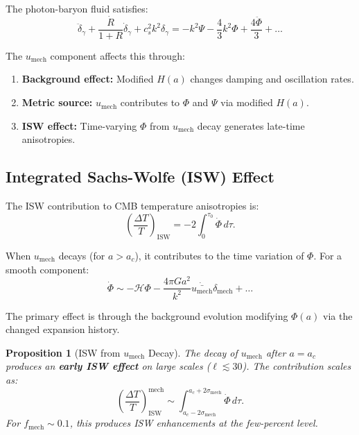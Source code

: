 \documentclass[11pt,a4paper]{article}
\newcommand{\umech}{\ensuremath{u_{\mathrm{mech}}}}
\newcommand{\fmech}{\ensuremath{f_{\mathrm{mech}}}}
\newcommand{\ac}{\ensuremath{a_c}}
\newcommand{\sigmamech}{\ensuremath{\sigma_{\mathrm{mech}}}}
\newtheorem{proposition}[theorem]{Proposition}
\theoremstyle{definition}
\theoremstyle{remark}
\begin{document}
The photon-baryon fluid satisfies:
\begin{equation}
\ddot{\delta}_\gamma + \frac{\dot{R}}{1+R}\dot{\delta}_\gamma + c_s^2 k^2 \delta_\gamma = -k^2\Psi - \frac{4}{3}k^2\Phi + \frac{4\ddot{\Phi}}{3} + \ldots
\end{equation}

The $\umech$ component affects this through:
\begin{enumerate}[leftmargin=*, itemsep=0.2em]
\item \textbf{Background effect:} Modified $H(a)$ changes damping and oscillation rates.
\item \textbf{Metric source:} $\umech$ contributes to $\Phi$ and $\Psi$ via modified $H(a)$.
\item \textbf{ISW effect:} Time-varying $\Phi$ from $\umech$ decay generates late-time anisotropies.
\end{enumerate}

\subsection{Integrated Sachs-Wolfe (ISW) Effect}
\label{sec:ISW}

The ISW contribution to CMB temperature anisotropies is:
\begin{equation}
\left(\frac{\Delta T}{T}\right)_{\mathrm{ISW}} = -2\int_0^{\tau_0} \dot{\Phi} \, d\tau.
\end{equation}

When $\umech$ decays (for $a > \ac$), it contributes to the time variation of $\Phi$. For a smooth component:
\begin{equation}
\dot{\Phi} \sim -\mathcal{H}\Phi - \frac{4\pi G a^2}{k^2}\dot{\bar{\umech}}\delta_{\mathrm{mech}} + \ldots
\end{equation}

The primary effect is through the background evolution modifying $\Phi(a)$ via the changed expansion history.

\begin{proposition}[ISW from $\umech$ Decay]
\label{prop:ISW_mech}
The decay of $\umech$ after $a = \ac$ produces an \textbf{early ISW effect} on large scales ($\ell \lesssim 30$). The contribution scales as:
\begin{equation}
\left(\frac{\Delta T}{T}\right)_{\mathrm{ISW}}^{\mathrm{mech}} \sim \int_{a_c - 2\sigmamech}^{a_c + 2\sigmamech} \dot{\Phi} \, d\tau.
\end{equation}
For $\fmech \sim 0.1$, this produces ISW enhancements at the few-percent level.
\end{proposition}
\end{document}
